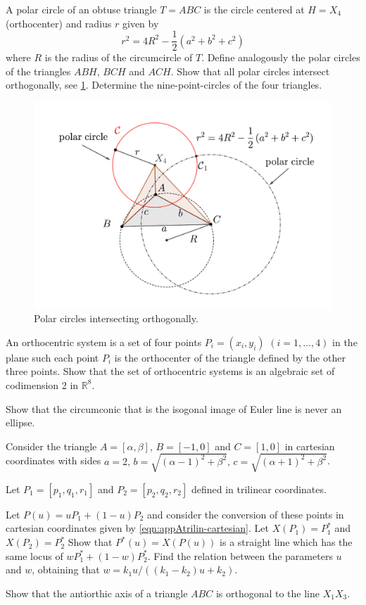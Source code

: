 \begin{exercise}
A polar circle of an obtuse triangle $T=ABC$ is the  circle centered at $H=X_4$ (orthocenter) and radius $r$ given by
\[ r^2=4R^2-\frac{1}{2}(a^2+b^2+c^2)\]
where $R$ is the radius of the circumcircle of $T$. Define analogously the polar circles of the triangles $ABH$, $BCH$ and $ACH$. Show that all polar circles intersect orthogonally, see \cref{fig:pics-appA-polarcircles}.
Determine the nine-point-circles of the four triangles.

\begin{figure}
    \centering
    \includegraphics[scale=0.4]{zappA/pics/pics-appA-108-polar-circle-ortocentro.pdf}
    \caption{Polar circles intersecting orthogonally.}
    \label{fig:pics-appA-polarcircles}
\end{figure}

An orthocentric system is a set of four points $P_i=(x_i,y_i)$ $ (i=1,\ldots,4)$ in the plane such each point $P_i$ is the orthocenter of the triangle defined by the other three points. Show that the set of orthocentric systems is an algebraic set  of codimension 2 in $\mathbb{R}^8$.
\end{exercise}

\begin{exercise}
Show that the circumconic that is the isogonal image of Euler line is never an ellipse. 
\label{ex:appA-isogonal-euler}
\end{exercise}

\begin{exercise}
Consider the triangle $A=[\alpha,\beta]$, $B=[-1,0]$
and $C=[1,0]$ in cartesian coordinates with sides
$a=2,\, b=\sqrt{(\alpha-1)^2+\beta^2}, \, c=\sqrt{(\alpha+1)^2+\beta^2}$.

Let   $P_1=[p_1,q_1,r_1]$ and $P_2=[p_2,q_2,r_2]$ defined in trilinear coordinates.
 
Let $P(u)=u P_1+(1-u) P_2 $ and consider the conversion of these points in cartesian coordinates given by \cref{eqn:appAtrilin-cartesian}.
Let $X(P_1)=P_1^*$ and $X(P_2)=P_2^*$
Show that $P^{*}(u)=X(P(u))$ is a straight line which has the same locus of $w P_1^{*}+(1-w)P_2^{*}$. Find the relation between the parameters $u$ and $w$, obtaining that $w=k_1 u/((k_1 -k_2)u+k_2)$.
\end{exercise}

\begin{exercise} Show that the
 antiorthic axis of a triangle $ABC$ is orthogonal to the line $X_1X_3$.
\end{exercise}